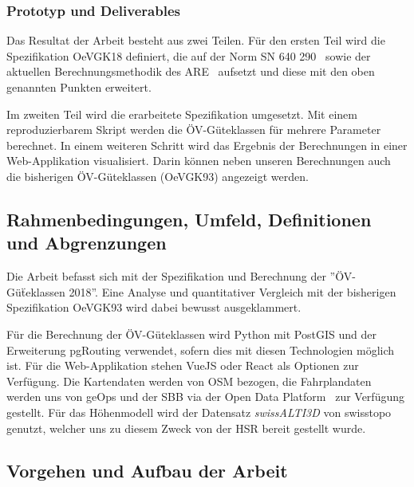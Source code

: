 \subsubsection{Prototyp und Deliverables}
\label{Ziele und Unterziele:Prototyp und Deliverables}

Das Resultat der Arbeit besteht aus zwei Teilen.
Für den ersten Teil wird die Spezifikation \gls{OeVGK18} definiert, die auf der Norm SN 640 290~\cite{sn640290} sowie der aktuellen Berechnungsmethodik des \acs{ARE}~\cite{berechnung_are} aufsetzt und diese mit den oben genannten Punkten erweitert.

Im zweiten Teil wird die erarbeitete Spezifikation umgesetzt.
Mit einem reproduzierbarem Skript werden die \acs{ÖV}-Güteklassen für mehrere Parameter berechnet.
In einem weiteren Schritt wird das Ergebnis der Berechnungen in einer Web-Applikation visualisiert.
Darin können neben unseren Berechnungen auch die bisherigen \acs{ÖV}-Güteklassen (\gls{OeVGK93}) angezeigt werden.

\subsection{Rahmenbedingungen, Umfeld, Definitionen und Abgrenzungen}
\label{Einführung:Rahmenbedingungen, Umfeld, Definitionen, Abgrenzungen}

Die Arbeit befasst sich mit der Spezifikation und Berechnung der ''ÖV-Güẗeklassen 2018''.
Eine Analyse und quantitativer Vergleich mit der bisherigen Spezifikation \gls{OeVGK93} wird dabei bewusst ausgeklammert.

Für die Berechnung der ÖV-Güteklassen wird Python mit PostGIS und der Erweiterung pgRouting verwendet, sofern dies mit diesen Technologien möglich ist.
Für die Web-Applikation stehen VueJS oder React als Optionen zur Verfügung. Die Kartendaten werden von \ac{OSM} bezogen, die Fahrplandaten werden uns von geOps und der SBB via der Open Data Platform~\cite{sbb_open_transport_data} zur Verfügung gestellt.
Für das Höhenmodell wird der Datensatz \emph{swissALTI3D} von swisstopo~\cite{swissalti3d_swisstopo} genutzt, welcher uns zu diesem Zweck von der HSR bereit gestellt wurde.

\subsection{Vorgehen und Aufbau der Arbeit}
\label{Einführung:Vorgehen und Aufbau der Arbeit}

